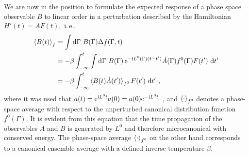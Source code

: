 We are now in the position to formulate the expected response of a phase space observable $B$ to linear order in a perturbation described by the Hamiltonian $H'(t) = A F(t)$,~i.\,e.,~
\begin{align}
\braket{B (t)}_f
    &= \int \d \Gamma ~  B (\Gamma) \Delta f (\Gamma, t) \\
    &= - \beta \int_{-\infty}^t 
      \int \d \Gamma ~  
       B (\Gamma) \, {\rm e}^{-\im L^0 (\Gamma) (t - t')} \dot{A}(\Gamma)
       f^0(\Gamma) F(t') ~ \d t' \\
    &= - \beta \int_{-\infty}^t 
      \braket{B(t) \dot{A}(t')}_{f^0} F(t') ~ \d t'~,
  \label{eq:lr.dB}
\end{align}
where it was used that $a(t) = {\rm e}^{{\rm i} L^0 t} a(0) = a(0) {\rm e}^{-{\rm i} L^0 t}$~\cite[p.\,498]{Tuckerman}, and $\braket{\cdot}_{f^0}$ denotes a phase-space average with respect to the unperturbed canonical distribution function $f^0 (\Gamma)$. It is evident from this equation that the time propagation of the observables $\dot A$ and $B$ is generated by $L^0$ and therefore microcanonical with conserved energy. The phase-space average $\braket{\cdot}_{f^0}$ on the other hand corresponds to a canonical ensemble average with a defined inverse temperature $\beta$.

